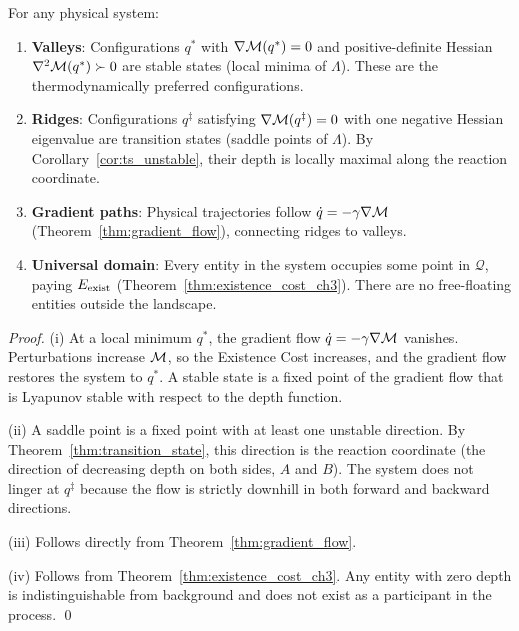 \begin{proposition}
\label{prop:landscape_topology}
For any physical system:
\begin{enumerate}[label=(\roman*)]
  \item \textbf{Valleys}: Configurations $q^*$ with $\nabla\mathcal{M}(q^*) = 0$
        and positive-definite Hessian $\nabla^2\mathcal{M}(q^*) \succ 0$ are stable
        states (local minima of $\Lambda$). These are the thermodynamically
        preferred configurations.
  \item \textbf{Ridges}: Configurations $q^\ddagger$ satisfying
        $\nabla\mathcal{M}(q^\ddagger) = 0$ with one negative Hessian eigenvalue are
        transition states (saddle points of $\Lambda$). By
        Corollary~\ref{cor:ts_unstable}, their depth is locally maximal along
        the reaction coordinate.
  \item \textbf{Gradient paths}: Physical trajectories follow $\dot{q} = -\gamma\nabla\mathcal{M}$
        (Theorem~\ref{thm:gradient_flow}), connecting ridges to valleys.
  \item \textbf{Universal domain}: Every entity in the system occupies some
        point in $\mathcal{Q}$, paying $E_{\mathrm{exist}}$ (Theorem~\ref{thm:existence_cost_ch3}).
        There are no free-floating entities outside the landscape.
\end{enumerate}
\end{proposition}

\begin{proof}
(i) At a local minimum $q^*$, the gradient flow $\dot{q} = -\gamma\nabla\mathcal{M}$
vanishes. Perturbations increase $\mathcal{M}$, so the Existence Cost increases,
and the gradient flow restores the system to $q^*$. A stable state is a
fixed point of the gradient flow that is Lyapunov stable with respect to the
depth function.

(ii) A saddle point is a fixed point with at least one unstable direction.
By Theorem~\ref{thm:transition_state}, this direction is the reaction coordinate
(the direction of decreasing depth on both sides, $A$ and $B$). The system
does not linger at $q^\ddagger$ because the flow is strictly downhill in
both forward and backward directions.

(iii) Follows directly from Theorem~\ref{thm:gradient_flow}.

(iv) Follows from Theorem~\ref{thm:existence_cost_ch3}. Any entity with zero
depth is indistinguishable from background and does not exist as a participant
in the process. \qed
\end{proof}

